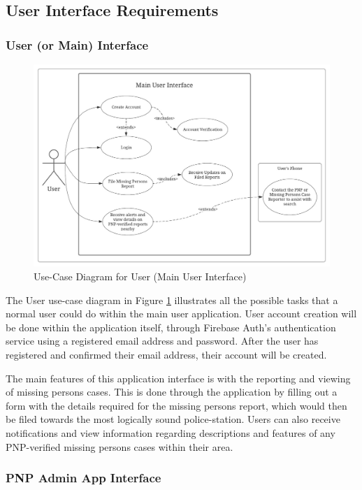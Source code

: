 \subsection{User Interface Requirements}

\subsubsection{User (or Main) Interface}

\begin{figure}[!h]
    \centering
    \includegraphics[width=\textwidth]{figures/Chapter3/Chapt3_UseCase_Main.jpeg}
    \caption{Use-Case Diagram for User (Main User Interface)}
    \label{fig:UseCaseMain}
\end{figure}
The User use-case diagram in Figure \ref{fig:UseCaseMain} illustrates all the possible tasks that a normal user could do within the main user application. User account creation will be done within the application itself, through Firebase Auth’s authentication service using a registered email address and password. After the user has registered and confirmed their email address, their account will be created. 

The main features of this application interface is with the reporting and viewing of missing persons cases. This is done through the application by filling out a form with the details required for the missing persons report, which would then be filed towards the most logically sound police-station. Users can also receive notifications and view information regarding  descriptions and features of any PNP-verified missing persons cases within their area.

\subsubsection{PNP Admin App Interface}


